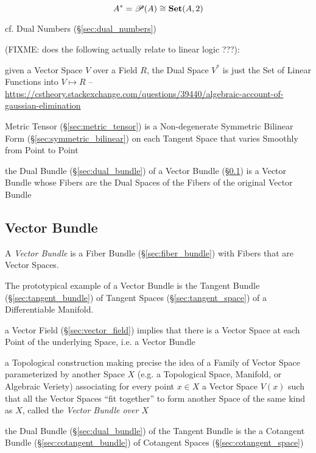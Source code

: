 \[
  A^* = \mathscr{P}(A) \cong \mathbf{Set}(A,2)
\]\cite{awodey06}

cf. Dual Numbers (\S\ref{sec:dual_numbers})

(FIXME: does the following actually relate to linear logic ???):

given a Vector Space $V$ over a Field $R$, the Dual Space $V^*$ is just the Set
of Linear Functions into $V \mapsto R$
--\url{https://cstheory.stackexchange.com/questions/39440/algebraic-account-of-gaussian-elimination}

Metric Tensor (\S\ref{sec:metric_tensor}) is a Non-degenerate Symmetric Bilinear
Form (\S\ref{sec:symmetric_bilinear}) on each Tangent Space that varies Smoothly
from Point to Point

the Dual Bundle (\S\ref{sec:dual_bundle}) of a Vector Bundle
(\S\ref{sec:vector_bundle}) is a Vector Bundle whose Fibers are the Dual Spaces
of the Fibers of the original Vector Bundle



\subsection{Vector Bundle}\label{sec:vector_bundle}


A \emph{Vector Bundle} is a Fiber Bundle (\S\ref{sec:fiber_bundle}) with Fibers
that are Vector Spaces.

The prototypical example of a Vector Bundle is the Tangent Bundle
(\S\ref{sec:tangent_bundle}) of Tangent Spaces (\S\ref{sec:tangent_space}) of a
Differentiable Manifold.

a Vector Field (\S\ref{sec:vector_field}) implies that there is a Vector Space
at each Point of the underlying Space, i.e. a Vector Bundle

a Topological construction making precise the idea of a Family of Vector Space
parameterized by another Space $X$ (e.g. a Topological Space, Manifold, or
Algebraic Veriety) associating for every point $x \in X$ a Vector Space $V(x)$
such that all the Vector Spaces ``fit together'' to form another Space of the
same kind as $X$, called the \emph{Vector Bundle over $X$}

the Dual Bundle (\S\ref{sec:dual_bundle}) of the Tangent Bundle is the
a Cotangent Bundle (\S\ref{sec:cotangent_bundle}) of
Cotangent Spaces (\S\ref{sec:cotangent_space})

